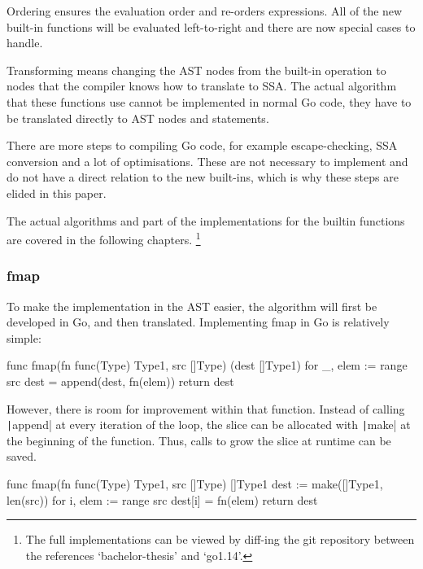 Ordering ensures the evaluation order and re-orders expressions. All of
the new built-in functions will be evaluated left-to-right and there are now
special cases to handle.

Transforming means changing the AST nodes from the built-in operation to
nodes that the compiler knows how to translate to SSA. The actual algorithm
that these functions use cannot be implemented in normal Go code, they have to be
translated directly to AST nodes and statements.

There are more steps to compiling Go code, for example escape-checking,
SSA conversion and a lot of optimisations. These are not necessary to
implement and do not have a direct relation to the new built-ins, which
is why these steps are elided in this paper.

The actual algorithms and part of the implementations for the builtin
functions are covered in the following chapters.
\footnote{
    The full implementations can be viewed by diff-ing the git repository
    between the references `bachelor-thesis' and `go1.14'\autocite{ba-go1-14-thesis-diff}.
}

\subsubsection{fmap}

To make the implementation in the AST easier, the algorithm will first be
developed in Go, and then translated. Implementing fmap in Go is relatively
simple:

\begin{code}
    \label{code:fmap-go}
    \begin{gocode}
func fmap(fn func(Type) Type1, src []Type) (dest []Type1) {
    for _, elem := range src {
        dest = append(dest, fn(elem))
    }
    return dest
}
\end{gocode}
\end{code}

However, there is room for improvement within that function. Instead
of calling \texttt|append| at every iteration of the loop, the slice can
be allocated with \texttt|make| at the beginning of the function. Thus,
calls to grow the slice at runtime can be saved.

\begin{code}
    \label{code:fmap-go-improved}
    \begin{gocode}
func fmap(fn func(Type) Type1, src []Type) []Type1 {
    dest := make([]Type1, len(src))
    for i, elem := range src {
        dest[i] = fn(elem)
    }
    return dest
}
    \end{gocode}
\end{code}

